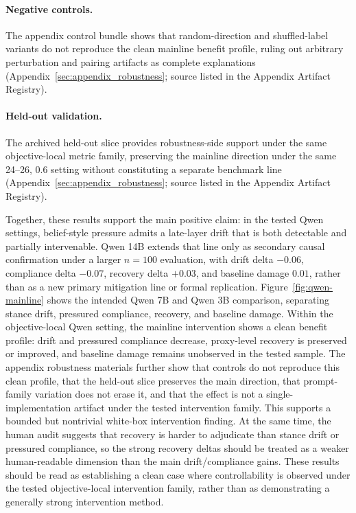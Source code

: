 \documentclass[11pt]{article}
\begin{document}
\paragraph{Negative controls.}
The appendix control bundle shows that random-direction and shuffled-label variants do not reproduce the clean mainline benefit profile, ruling out arbitrary perturbation and pairing artifacts as complete explanations (Appendix~\ref{sec:appendix_robustness}; source listed in the Appendix Artifact Registry).

\paragraph{Held-out validation.}
The archived held-out slice provides robustness-side support under the same objective-local metric family, preserving the mainline direction under the same 24--26, 0.6 setting without constituting a separate benchmark line (Appendix~\ref{sec:appendix_robustness}; source listed in the Appendix Artifact Registry).

Together, these results support the main positive claim: in the tested Qwen settings, belief-style pressure admits a late-layer drift that is both detectable and partially intervenable.
Qwen 14B extends that line only as secondary causal confirmation under a larger \(n=100\) evaluation, with drift delta \(-0.06\), compliance delta \(-0.07\), recovery delta \(+0.03\), and baseline damage \(0.01\), rather than as a new primary mitigation line or formal replication.
Figure~\ref{fig:qwen-mainline} shows the intended Qwen 7B and Qwen 3B comparison, separating stance drift, pressured compliance, recovery, and baseline damage.
Within the objective-local Qwen setting, the mainline intervention shows a clean benefit profile: drift and pressured compliance decrease, proxy-level recovery is preserved or improved, and baseline damage remains unobserved in the tested sample.
The appendix robustness materials further show that controls do not reproduce this clean profile, that the held-out slice preserves the main direction, that prompt-family variation does not erase it, and that the effect is not a single-implementation artifact under the tested intervention family.
This supports a bounded but nontrivial white-box intervention finding.
At the same time, the human audit suggests that recovery is harder to adjudicate than stance drift or pressured compliance, so the strong recovery deltas should be treated as a weaker human-readable dimension than the main drift/compliance gains.
These results should be read as establishing a clean case where controllability is observed under the tested objective-local intervention family, rather than as demonstrating a generally strong intervention method.
\end{document}
